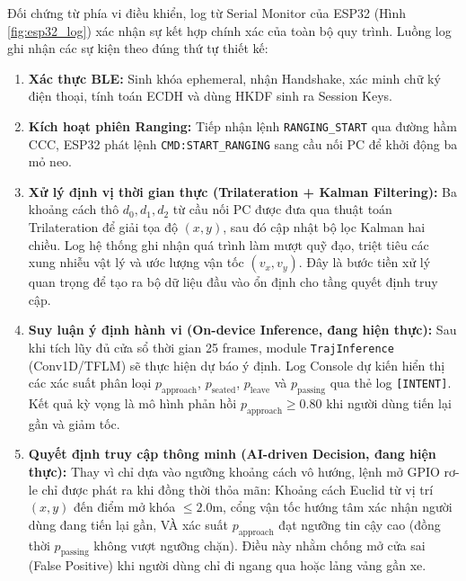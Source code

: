 Đối chứng từ phía vi điều khiển, log từ Serial Monitor của ESP32 (Hình \ref{fig:esp32_log}) xác nhận sự kết hợp chính xác của toàn bộ quy trình. Luồng log ghi nhận các sự kiện theo đúng thứ tự thiết kế:
\begin{enumerate}
    \item \textbf{Xác thực BLE:} Sinh khóa ephemeral, nhận Handshake, xác minh chữ ký điện thoại, tính toán ECDH và dùng HKDF sinh ra Session Keys.
    \item \textbf{Kích hoạt phiên Ranging:} Tiếp nhận lệnh \texttt{RANGING\_START} qua đường hầm CCC, ESP32 phát lệnh \texttt{CMD:START\_RANGING} sang cầu nối PC để khởi động ba mỏ neo.
    \item \textbf{Xử lý định vị thời gian thực (Trilateration + Kalman Filtering):} Ba khoảng cách thô $d_0, d_1, d_2$ từ cầu nối PC được đưa qua thuật toán Trilateration để giải tọa độ $(x, y)$, sau đó cập nhật bộ lọc Kalman hai chiều. Log hệ thống ghi nhận quá trình làm mượt quỹ đạo, triệt tiêu các xung nhiễu vật lý và ước lượng vận tốc $(v_x, v_y)$. Đây là bước tiền xử lý quan trọng để tạo ra bộ dữ liệu đầu vào ổn định cho tầng quyết định truy cập.
    \item \textbf{Suy luận ý định hành vi (On-device Inference, đang hiện thực):} Sau khi tích lũy đủ cửa sổ thời gian 25 frames, module \texttt{TrajInference} (Conv1D/TFLM) sẽ thực hiện dự báo ý định. Log Console dự kiến hiển thị các xác suất phân loại $p_{\text{approach}}$, $p_{\text{seated}}$, $p_{\text{leave}}$ và $p_{\text{passing}}$ qua thẻ log \texttt{[INTENT]}. Kết quả kỳ vọng là mô hình phản hồi $p_{\text{approach}} \ge 0.80$ khi người dùng tiến lại gần và giảm tốc.
    \item \textbf{Quyết định truy cập thông minh (AI-driven Decision, đang hiện thực):} Thay vì chỉ dựa vào ngưỡng khoảng cách vô hướng, lệnh mở GPIO rơ-le chỉ được phát ra khi đồng thời thỏa mãn: Khoảng cách Euclid từ vị trí $(x, y)$ đến điểm mở khóa $\le 2.0$m, cổng vận tốc hướng tâm xác nhận người dùng đang tiến lại gần, VÀ xác suất $p_{\text{approach}}$ đạt ngưỡng tin cậy cao (đồng thời $p_{\text{passing}}$ không vượt ngưỡng chặn). Điều này nhằm chống mở cửa sai (False Positive) khi người dùng chỉ đi ngang qua hoặc lảng vảng gần xe.
\end{enumerate}



